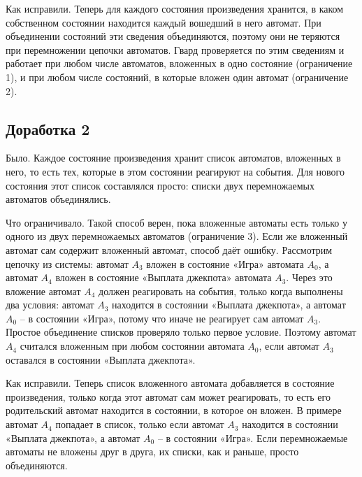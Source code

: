 \documentclass[12pt]{article}
\begin{document}
Как исправили. Теперь для каждого состояния произведения хранится, в каком собственном состоянии находится каждый вошедший в него автомат. При объединении состояний эти сведения объединяются, поэтому они не теряются при перемножении цепочки автоматов. Гвард проверяется по этим сведениям и работает при любом числе автоматов, вложенных в одно состояние (ограничение 1), и при любом числе состояний, в которые вложен один автомат (ограничение 2).

\subsection*{Доработка 2}

Было. Каждое состояние произведения хранит список автоматов, вложенных в него, то есть тех, которые в этом состоянии реагируют на события. Для нового состояния этот список составлялся просто: списки двух перемножаемых автоматов объединялись.

Что ограничивало. Такой способ верен, пока вложенные автоматы есть только у одного из двух перемножаемых автоматов (ограничение 3). Если же вложенный автомат сам содержит вложенный автомат, способ даёт ошибку. Рассмотрим цепочку из системы: автомат $A_{3}$ вложен в состояние «Игра» автомата $A_{0}$, а автомат $A_{4}$ вложен в состояние «Выплата джекпота» автомата $A_{3}$. Через это вложение автомат $A_{4}$ должен реагировать на события, только когда выполнены два условия: автомат $A_{3}$ находится в состоянии «Выплата джекпота», а автомат $A_{0}$ – в состоянии «Игра», потому что иначе не реагирует сам автомат $A_{3}$. Простое объединение списков проверяло только первое условие. Поэтому автомат $A_{4}$ считался вложенным при любом состоянии автомата $A_{0}$, если автомат $A_{3}$ оставался в состоянии «Выплата джекпота».

Как исправили. Теперь список вложенного автомата добавляется в состояние произведения, только когда этот автомат сам может реагировать, то есть его родительский автомат находится в состоянии, в которое он вложен. В примере автомат $A_{4}$ попадает в список, только если автомат $A_{3}$ находится в состоянии «Выплата джекпота», а автомат $A_{0}$ – в состоянии «Игра». Если перемножаемые автоматы не вложены друг в друга, их списки, как и раньше, просто объединяются.
\end{document}
